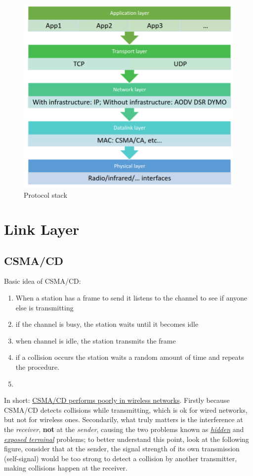 \begin{figure}[htbp]
   \centering
   \includegraphics{images/stack.png}
   \caption{Protocol stack}
   \label{fig:stack}
\end{figure}

\section{Link Layer}
\subsection{CSMA/CD}
Basic idea of CSMA/CD:
\begin{enumerate}
   \item When a station has a frame to send it listens to
   the channel to see if anyone else is transmitting
   \item if the channel is busy, the station waits until it
   becomes idle
   \item when channel is idle, the station transmits the
   frame
   \item if a collision occurs the station waits a random
   amount of time and repeats the procedure.
   \item[]
\end{enumerate}

In short: \ul{CSMA/CD performs poorly in wireless networks}.
Firstly because CSMA/CD detects collisions while transmitting, which is ok for wired networks, but not for wireless ones.
Secondarily, what truly matters is the interference at the \textit{receiver}, \textbf{not} at the \textit{sender}, causing the two problems known as \textit{\ul{hidden}} and \ul{\textit{exposed terminal}} problems;
to better understand this point, look at the following figure, consider that at the sender, the signal strength of its own transmission (self-signal) would be too strong to detect a collision by another transmitter, making collisions happen at the receiver.


